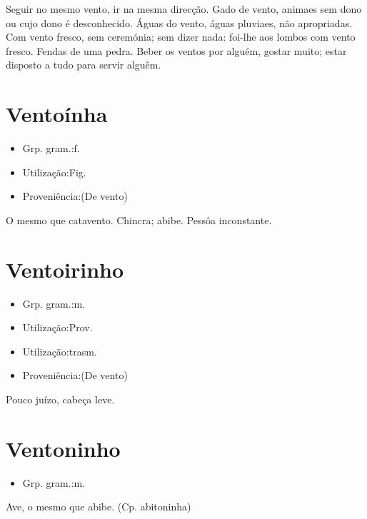 \documentclass{article}
\begin{document}
\textunderscore Seguir no mesmo vento\textunderscore , ir na mesma direcção.
\textunderscore Gado de vento\textunderscore , animaes sem dono ou cujo dono é desconhecido.
\textunderscore Águas do vento\textunderscore , águas pluviaes, não apropriadas.
\textunderscore Com vento fresco\textunderscore , sem ceremónia; sem dizer nada: \textunderscore foi-lhe aos lombos com vento fresco\textunderscore .
Fendas de uma pedra.
\textunderscore Beber os ventos por alguém\textunderscore , gostar muito; estar disposto a tudo para servir alguêm.
\section{Ventoínha}
\begin{itemize}
\item {Grp. gram.:f.}
\end{itemize}
\begin{itemize}
\item {Utilização:Fig.}
\end{itemize}
\begin{itemize}
\item {Proveniência:(De \textunderscore vento\textunderscore )}
\end{itemize}
O mesmo que \textunderscore catavento\textunderscore .
Chincra; abibe.
Pessôa inconstante.
\section{Ventoirinho}
\begin{itemize}
\item {Grp. gram.:m.}
\end{itemize}
\begin{itemize}
\item {Utilização:Prov.}
\end{itemize}
\begin{itemize}
\item {Utilização:trasm.}
\end{itemize}
\begin{itemize}
\item {Proveniência:(De \textunderscore vento\textunderscore )}
\end{itemize}
Pouco juízo, cabeça leve.
\section{Ventoninho}
\begin{itemize}
\item {Grp. gram.:m.}
\end{itemize}
Ave, o mesmo que \textunderscore abibe\textunderscore .
(Cp. \textunderscore abitoninha\textunderscore )
\end{document}
